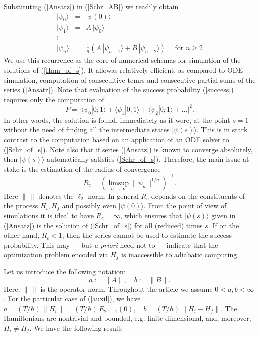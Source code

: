 \documentclass[11 pt]{article}
\begin{document}
Substituting (\ref{Ansatz}) in (\ref{Schr_AB}) we readily obtain
\begin{equation}\label{recurrence}
\begin{array}{lll}
|\psi_0\rangle &=& |\psi(0)\rangle \\
|\psi_1\rangle & =& A \,|\psi_0\rangle \\
\vdots & &\\
|\psi_n\rangle & = &\frac{1}{n} \left(A\, |\psi_{n-1}\rangle + B\, |\psi_{n-2}\rangle\right)\quad \mbox{ for } n\geq 2
\end{array}
\end{equation}
We use this recurrence as the core of numerical schemas for simulation of the solutions of (\ref{Ham_of_s}). It allowas relatively efficient, as compared to ODE simulation, computation of consecuitive temrs and consecutive partial sums of the series (\ref{Ansatz}). Note that evaluation of the success probability (\ref{success}) requires only the computation of 
\[
P =  |\langle\psi_0 | 0;1\rangle +\langle \psi_1| 0;1\rangle +\langle \psi_2 | 0;1\rangle+\ldots |^2.
\]
In other words, the solution is found, immediately as it were, at the point $s=1$ without the need of finding all the intermediate states $|\psi(s)\rangle$. This is in stark contrast to the computation based on an application of an ODE solver to (\ref{Schr_of_s}).
 Note also that if series (\ref{Ansatz}) is known to converge absolutely, then $|\psi(s)\rangle$ automatically satisfies (\ref{Schr_of_s}). Therefore, the main issue at stake is the estimation of the radius of convergence
\begin{equation}\label{def_Rc}
R_{c} = \left(\limsup\limits_{n \rightarrow \infty} \|\psi_n\|^{1/n}\right)^{-1}.
\end{equation}
Here $\|\,\|$ denotes the $\ell_2$ norm. In general $R_c$ depends on the constituents of the process $H_i, H_f$ and possibly even $|\psi(0)\rangle$. From the point of view of simulations it is ideal to have $R_c = \infty$, which ensures that $|\psi(s)\rangle$ given in (\ref{Ansatz}) is the solution of (\ref{Schr_of_s}) for all (reduced) times $s$. If on the other hand, $R_c <1$, then the series  cannot be used to estimate the success probability. This may --- but \textit{a priori} need not to --- indicate that the optimization problem encoded via $H_f$ is inaccessible to adiabatic computing.

Let us introduce the following notation:
\begin{equation}
a := \|A\| , \quad b := \|B\| .
\end{equation}
Here, $\|\,\|$ is the operator norm. 
Throughout the article we assume $0< a,b < \infty$. For the particular case of (\ref{auxil}), we have $a  = (T/\hbar)\,\|H_i\| = (T/\hbar)\,E_{2^n-1}(0), \quad b =  (T/\hbar)\,\|H_i-H_f\|$. The Hamiltonians are nontrivial and bounded, e.g. finite dimensional, and, moreover, $H_i\neq H_f$. We have the following result:
\end{document}

